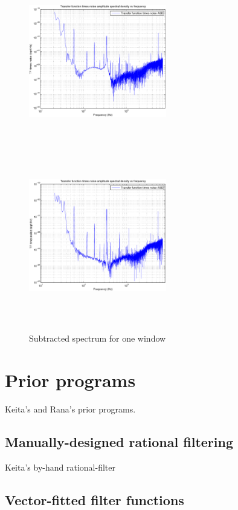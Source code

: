\begin{figure}
\includegraphics[height=75mm, width=60mm]{clip-MICH-sub.eps}
\includegraphics[height=75mm, width=60mm]{clip-PRC-sub.eps}
\caption{Subtracted spectrum for one window}
\end{figure}

    \section{Prior programs}
    \label{prior_programs}
   
        Keita's and Rana's prior programs.
        
        \subsection{Manually-designed rational filtering}
        \label{manual_design}

            Keita's by-hand rational-filter

        \subsection{Vector-fitted filter functions}
        \label{vectfit}

